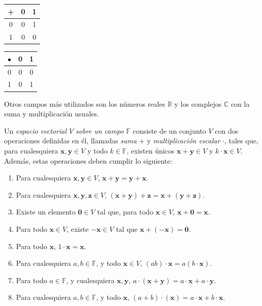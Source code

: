             \begin{center}
                \begin{tabular}{ c | c c }
                    + & 0 & 1 \\ \hline
                    0 & 0 & 1 \\  
                    1 & 0 & 0    
                \end{tabular}
            \end{center}

            \begin{center}
                \begin{tabular}{ c | c c }
                    $\bullet$ & 0 & 1 \\ \hline
                    0 & 0 & 0 \\  
                    1 & 0 & 1    
                \end{tabular}
            \end{center}

            Otros campos más utilizados son los números reales $\mathbb{R}$ y los complejos $\mathbb{C}$ con la suma y multiplicación usuales.


            Un \textit{espacio vectorial $V$ sobre un campo $\mathbb{F}$} consiste de un conjunto $V$ con dos operaciones definidas en él, llamadas  \textit{suma} $+$ y \textit{multiplicación escalar} $\cdot$, tales que, para cualesquiera $\mathbf{x,y} \in V$ y todo $k \in \mathbb{F}$, existen únicos $\mathbf{x + y} \in V$ y $k \cdot \mathbf{x} \in V$. Además, estas operaciones deben cumplir lo siguiente:
 
            \begin{enumerate}
                \item Para cualesquiera $\mathbf{x,y} \in V$, $\mathbf{x + y = y + x}$.
                \item Para cualesquiera $\mathbf{x,y,z} \in V$, $\mathbf{(x+y)+z = x+ (y+z)}$.
                \item Existe un elemento $\mathbf{0} \in V$ tal que, para todo $\mathbf{x} \in V$, $\mathbf{x + 0 = x}$.
                \item Para todo $\mathbf{x} \in V$, existe $\mathbf{-x} \in V$ tal que $\mathbf{x + (-x) = 0}$.
                \item Para todo $\mathbf{x}$, $1 \cdot \mathbf{x} = \mathbf{x}$.
                \item Para cualesquiera $a,b \in \mathbb{F}$, y todo $\mathbf{x} \in V$, $(ab)\cdot \mathbf{x} = a(b\cdot\mathbf{x})$.
                \item Para todo $a \in \mathbb{F}$, y cualesquiera $\mathbf{x,y}$, $a \cdot (\mathbf{x + y}) = a\cdot \mathbf{x} + a\cdot \mathbf{y}$.
                \item Para cualesquiera $a,b \in \mathbb{F}$, y todo $\mathbf{x}$, $(a+b) \cdot (\mathbf{x}) = a\cdot \mathbf{x} + b\cdot \mathbf{x}$.
            \end{enumerate}
 
